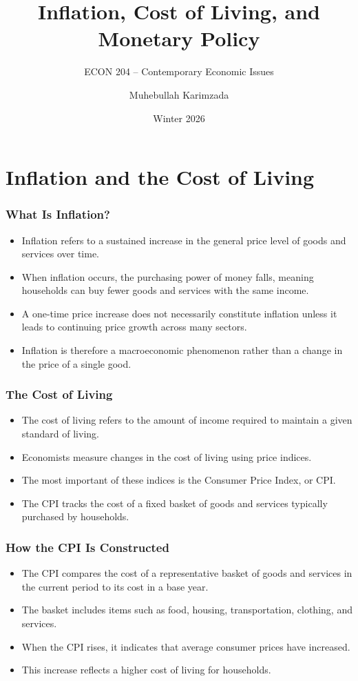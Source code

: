 \documentclass[aspectratio=169]{beamer}
\title{\textbf{Inflation, Cost of Living, and Monetary Policy}}
\subtitle{ECON 204 -- Contemporary Economic Issues}
\author{Muhebullah Karimzada}
\date{Winter 2026}
\begin{document}
\begin{frame}
\transfade
\titlepage
\end{frame}

\section{Inflation and the Cost of Living}

\begin{frame}
\transfade
\frametitle{What Is Inflation?}
\begin{itemize}[<+->]
\item Inflation refers to a sustained increase in the general price level of goods and services over time.
\item When inflation occurs, the purchasing power of money falls, meaning households can buy fewer goods and services with the same income.
\item A one-time price increase does not necessarily constitute inflation unless it leads to continuing price growth across many sectors.
\item Inflation is therefore a macroeconomic phenomenon rather than a change in the price of a single good.
\end{itemize}
\end{frame}

\begin{frame}
\transfade
\frametitle{The Cost of Living}
\begin{itemize}[<+->]
\item The cost of living refers to the amount of income required to maintain a given standard of living.
\item Economists measure changes in the cost of living using price indices.
\item The most important of these indices is the Consumer Price Index, or CPI.
\item The CPI tracks the cost of a fixed basket of goods and services typically purchased by households.
\end{itemize}
\end{frame}

\begin{frame}
\transfade
\frametitle{How the CPI Is Constructed}
\begin{itemize}[<+->]
\item The CPI compares the cost of a representative basket of goods and services in the current period to its cost in a base year.
\item The basket includes items such as food, housing, transportation, clothing, and services.
\item When the CPI rises, it indicates that average consumer prices have increased.
\item This increase reflects a higher cost of living for households.
\end{itemize}
\end{frame}
\end{document}
